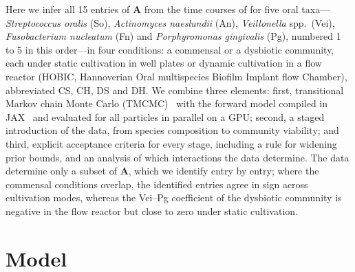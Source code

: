 \documentclass[preprint,12pt]{elsarticle}
\begin{document}
Here we infer all 15 entries of $\mathbf{A}$ from the time courses of \citet{heine2025influence} for five oral taxa---\textit{Streptococcus oralis} (So), \textit{Actinomyces naeslundii} (An), \textit{Veillonella} spp.\ (Vei), \textit{Fusobacterium nucleatum} (Fn) and \textit{Porphyromonas gingivalis} (Pg), numbered 1 to 5 in this order---in four conditions: a commensal or a dysbiotic community, each under static cultivation in well plates or dynamic cultivation in a flow reactor (HOBIC, Hannoverian Oral multispecies Biofilm Implant flow Chamber), abbreviated CS, CH, DS and DH.
We combine three elements:
first, transitional Markov chain Monte Carlo (TMCMC)~\citep{ChingChen2007TMCMC, Betz2016TMCMC} with the forward model compiled in JAX~\citep{jax2018github} and evaluated for all particles in parallel on a GPU;
second, a staged introduction of the data, from species composition to community viability; and
third, explicit acceptance criteria for every stage, including a rule for widening prior bounds, and an analysis of which interactions the data determine.
The data determine only a subset of $\mathbf{A}$, which we identify entry by entry; where the commensal conditions overlap, the identified entries agree in sign across cultivation modes, whereas the Vei--Pg coefficient of the dysbiotic community is negative in the flow reactor but close to zero under static cultivation.

\section{Model}
\label{sec:model}
\end{document}
